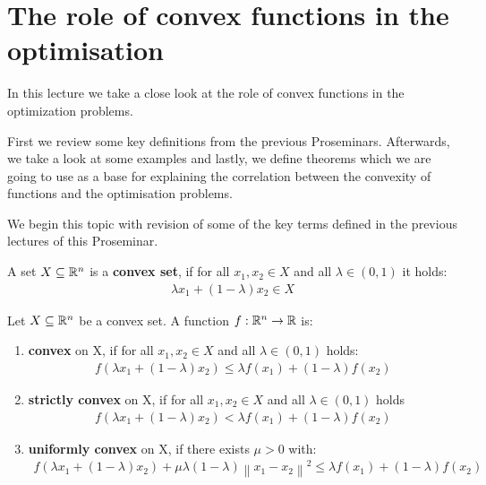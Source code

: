 \chapter{The role of convex functions in the optimisation}

In this lecture we take a close look at the role of convex functions in the optimization problems. 

First we review some key definitions from the previous Proseminars. Afterwards, we take a look at some examples and lastly, we define theorems which we are going to use as a base for explaining the correlation between the convexity of functions and the optimisation problems.


We begin this topic with revision of some of the key terms defined in the previous lectures of this Proseminar.

\begin{definition}
	A set $X \subseteq \mathbb{R}^n$  is a \textbf{convex set}, if for all $x_1, x_2\in X$ and all $\lambda\in(0,1)$ it holds: 
	\begin{align}
	\lambda x_1 + (1-\lambda) x_2\in X \label{definition:1:convexset} %
	\end{align}
\end{definition} 

\begin{definition}
	Let $X\subseteq\mathbb{R}^n$ be a convex set. A function $f:\mathbb{R}^n\rightarrow\mathbb{R}$ is:
	\begin{enumerate}   
		\item \textbf{convex} on X, if for all $x_1, x_2 \in X$ and all $\lambda\in(0,1)$ holds: 
		\begin{align}
		f(\lambda x_1 + (1-\lambda) x_2) \le \lambda f(x_1)+(1-\lambda)f(x_2)
		\label{definition:2:convex} %
		\end{align}
		
		\item \textbf{strictly convex} on X, if for all \(x_1, x_2\in{X}\) and all \(\lambda\in(0,1)\) holds
		\begin{align}
		f(\lambda{x_1} + (1-\lambda){x_2}) < \lambda f(x_1)+(1-\lambda)f(x_2)
		\label{definition:3:strictlyconvex}
		\end{align}
		
		\item \textbf{uniformly convex} on X, if there exists $\mu > 0$ with:
		\begin{align}
		f(\lambda x_1 + (1-\lambda) x_2) + \mu\lambda (1-\lambda)\left\lVert x_1-x_2\right\rVert^2 \le \lambda f(x_1)+(1-\lambda)f(x_2)
		\label{definition:4:uniconvex}
		\end{align}
	\end{enumerate}  
\end{definition}

